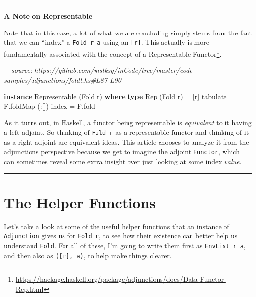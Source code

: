 \documentclass[]{article}
\newenvironment{Shaded}{}{}
\newcommand{\CommentTok}[1]{\textcolor[rgb]{0.38,0.63,0.69}{\textit{#1}}}
\newcommand{\DataTypeTok}[1]{\textcolor[rgb]{0.56,0.13,0.00}{#1}}
\newcommand{\FunctionTok}[1]{\textcolor[rgb]{0.02,0.16,0.49}{#1}}
\newcommand{\KeywordTok}[1]{\textcolor[rgb]{0.00,0.44,0.13}{\textbf{#1}}}
\newcommand{\NormalTok}[1]{#1}
\newcommand{\OperatorTok}[1]{\textcolor[rgb]{0.40,0.40,0.40}{#1}}
\newcommand{\OtherTok}[1]{\textcolor[rgb]{0.00,0.44,0.13}{#1}}
\renewcommand{\href}[2]{#2\footnote{\url{#1}}}
\begin{document}
\begin{center}\rule{0.5\linewidth}{\linethickness}\end{center}

\textbf{A Note on Representable}

Note that in this case, a lot of what we are concluding simply stems from the
fact that we can ``index'' a \texttt{Fold\ r\ a} using an \texttt{{[}r{]}}. This
actually is more fundamentally associated with the concept of a
\href{https://hackage.haskell.org/package/adjunctions/docs/Data-Functor-Rep.html}{Representable
Functor}.

\begin{Shaded}
\begin{Highlighting}[]
\CommentTok{{-}{-} source: https://github.com/mstksg/inCode/tree/master/code{-}samples/adjunctions/foldl.hs\#L87{-}L90}

\KeywordTok{instance} \DataTypeTok{Representable}\NormalTok{ (}\DataTypeTok{Fold}\NormalTok{ r) }\KeywordTok{where}
    \KeywordTok{type} \DataTypeTok{Rep}\NormalTok{ (}\DataTypeTok{Fold}\NormalTok{ r) }\OtherTok{=}\NormalTok{ [r]}
\NormalTok{    tabulate }\OtherTok{=}\NormalTok{ F.foldMap (}\OperatorTok{:}\NormalTok{[])}
    \FunctionTok{index}    \OtherTok{=}\NormalTok{ F.fold}
\end{Highlighting}
\end{Shaded}

As it turns out, in Haskell, a functor being representable is \emph{equivalent}
to it having a left adjoint. So thinking of \texttt{Fold\ r} as a representable
functor and thinking of it as a right adjoint are equivalent ideas. This article
chooses to analyze it from the adjunctions perspective because we get to imagine
the adjoint \texttt{Functor}, which can sometimes reveal some extra insight over
just looking at some index \emph{value}.

\begin{center}\rule{0.5\linewidth}{\linethickness}\end{center}

\hypertarget{the-helper-functions}{%
\section{The Helper Functions}\label{the-helper-functions}}

Let's take a look at some of the useful helper functions that an instance of
\texttt{Adjunction} gives us for \texttt{Fold\ r}, to see how their existence
can better help us understand \texttt{Fold}. For all of these, I'm going to
write them first as \texttt{EnvList\ r\ a}, and then also as
\texttt{({[}r{]},\ a)}, to help make things clearer.
\end{document}

